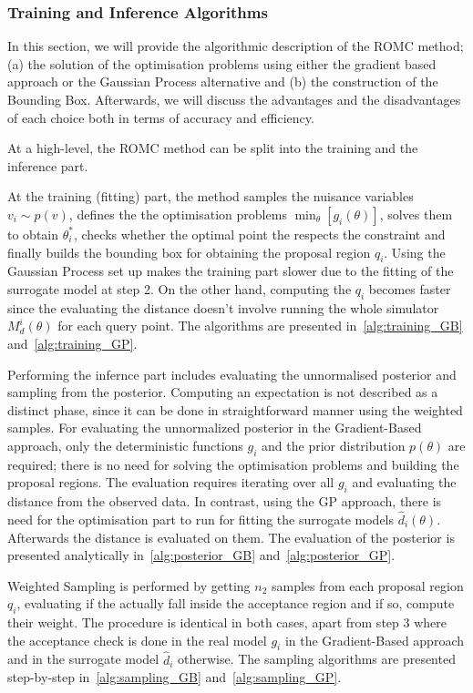 \subsubsection{Training and Inference Algorithms}
\label{subsubsec:algorithmic_description}

In this section, we will provide the algorithmic description of the ROMC method; (a) the solution of the optimisation problems using either the gradient based approach or the Gaussian Process alternative and (b) the construction of the Bounding Box. Afterwards, we will discuss the advantages and the disadvantages of each choice both in terms of accuracy and efficiency.

\noindent
At a high-level, the ROMC method can be split into the training and the inference part.

At the training (fitting) part, the method samples the nuisance variables $v_i \sim p(v)$, defines the the optimisation problems $\min_\theta [g_i(\theta)]$, solves them to obtain $\theta_i^*$, checks whether the optimal point the respects the constraint and finally builds the bounding box for obtaining the proposal region $q_i$. Using the Gaussian Process set up makes the training part slower due to the fitting of the surrogate model at step 2. On the other hand, computing the $q_i$ becomes faster since the evaluating the distance doesn't involve running the whole simulator $M_d^i(\theta)$ for each query point. The algorithms are presented in~\ref{alg:training_GB} and~\ref{alg:training_GP}.

Performing the infernce part includes evaluating the unnormalised posterior and sampling from the posterior. Computing an expectation is not described as a distinct phase, since it can be done in straightforward manner using the weighted samples. For evaluating the unnormalized posterior in the Gradient-Based approach, only the deterministic functions $g_i$ and the prior distribution $p(\theta)$ are required; there is no need for solving the optimisation problems and building the proposal regions. The evaluation requires iterating over all $g_i$ and evaluating the distance from the observed data. In contrast, using the GP approach, there is need for the optimisation part to run for fitting the surrogate models $\hat{d}_i(\theta)$. Afterwards the distance is evaluated on them. The evaluation of the posterior is presented analytically in~\ref{alg:posterior_GB} and~\ref{alg:posterior_GP}.

Weighted Sampling is performed by getting $n_2$ samples from each proposal region $q_i$, evaluating if the actually fall inside the acceptance region and if so, compute their weight. The procedure is identical in both cases, apart from step 3 where the acceptance check is done in the real model $g_i$ in the Gradient-Based approach and in the surrogate model $\hat{d}_i$ otherwise. The sampling algorithms are presented step-by-step in~\ref{alg:sampling_GB} and~\ref{alg:sampling_GP}.


